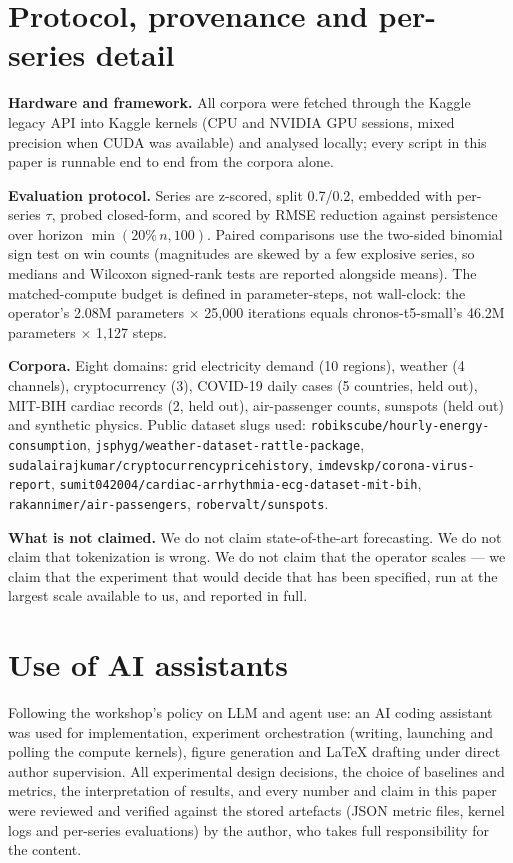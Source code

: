 \documentclass{article}
\begin{document}
\section{Protocol, provenance and per-series detail}
\label{app:protocol}
\textbf{Hardware and framework.} All corpora were fetched through the Kaggle
legacy API into Kaggle kernels (CPU and NVIDIA GPU sessions, mixed precision
when CUDA was available) and analysed locally; every script in this paper is
runnable end to end from the corpora alone.

\textbf{Evaluation protocol.} Series are z-scored, split 0.7/0.2, embedded with
per-series $\tau$, probed closed-form, and scored by RMSE reduction against
persistence over horizon $\min(20\%\,n,100)$. Paired comparisons use the
two-sided binomial sign test on win counts (magnitudes are skewed by a few
explosive series, so medians and Wilcoxon signed-rank tests are reported
alongside means). The matched-compute budget is defined in parameter-steps,
not wall-clock: the operator's 2.08M parameters $\times$ 25{,}000 iterations
equals chronos-t5-small's 46.2M parameters $\times$ 1{,}127 steps.

\textbf{Corpora.} Eight domains: grid electricity demand (10 regions),
weather (4 channels), cryptocurrency (3), COVID-19 daily cases (5 countries,
held out), MIT-BIH cardiac records (2, held out), air-passenger counts,
sunspots (held out) and synthetic physics. Public dataset slugs used:
\texttt{robikscube/hourly-energy-consumption},
\texttt{jsphyg/weather-dataset-rattle-package},
\texttt{sudalairajkumar/cryptocurrencypricehistory},
\texttt{imdevskp/corona-virus-report},
\texttt{sumit042004/cardiac-arrhythmia-ecg-dataset-mit-bih},
\texttt{rakannimer/air-passengers}, \texttt{robervalt/sunspots}.

\textbf{What is not claimed.} We do not claim state-of-the-art forecasting.
We do not claim that tokenization is wrong. We do not claim that the operator
scales --- we claim that the experiment that would decide that has been
specified, run at the largest scale available to us, and reported in full.

\section{Use of AI assistants}
\label{app:ai}
Following the workshop's policy on LLM and agent use: an AI coding assistant
was used for implementation, experiment orchestration (writing, launching and
polling the compute kernels), figure generation and LaTeX drafting under
direct author supervision. All experimental design decisions, the choice of
baselines and metrics, the interpretation of results, and every number and
claim in this paper were reviewed and verified against the stored artefacts
(JSON metric files, kernel logs and per-series evaluations) by the author,
who takes full responsibility for the content.
\end{document}
